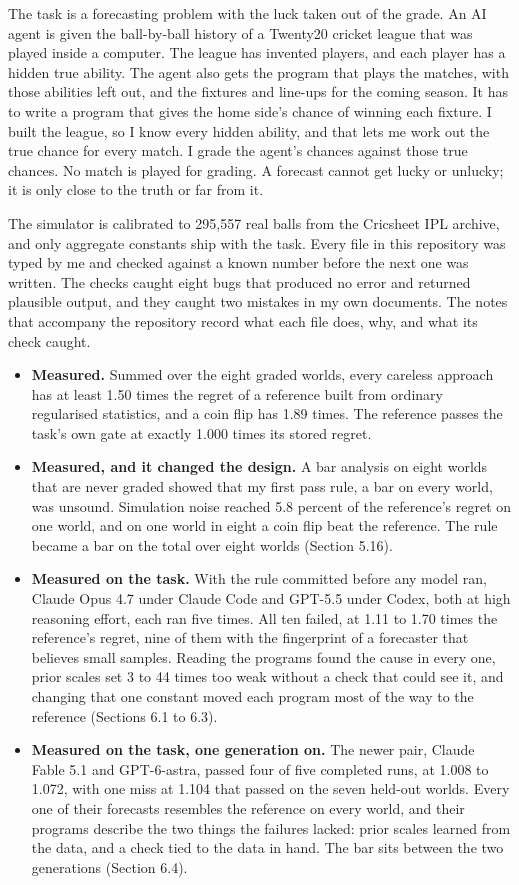 \documentclass[11pt,letterpaper]{article}
\begin{document}
The task is a forecasting problem with the luck taken out of the grade. An AI agent is given the ball-by-ball history of a Twenty20 cricket league that was played inside a computer. The league has invented players, and each player has a hidden true ability. The agent also gets the program that plays the matches, with those abilities left out, and the fixtures and line-ups for the coming season. It has to write a program that gives the home side's chance of winning each fixture. I built the league, so I know every hidden ability, and that lets me work out the true chance for every match. I grade the agent's chances against those true chances. No match is played for grading. A forecast cannot get lucky or unlucky; it is only close to the truth or far from it.


The simulator is calibrated to 295,557 real balls from the Cricsheet IPL archive, and only aggregate constants ship with the task. Every file in this repository was typed by me and checked against a known number before the next one was written. The checks caught eight bugs that produced no error and returned plausible output, and they caught two mistakes in my own documents. The notes that accompany the repository record what each file does, why, and what its check caught.


\begin{itemize}[leftmargin=1.4em, itemsep=2pt]
\item \textbf{Measured.} Summed over the eight graded worlds, every careless approach has at least 1.50 times the regret of a reference built from ordinary regularised statistics, and a coin flip has 1.89 times. The reference passes the task's own gate at exactly 1.000 times its stored regret.
\item \textbf{Measured, and it changed the design.} A bar analysis on eight worlds that are never graded showed that my first pass rule, a bar on every world, was unsound. Simulation noise reached 5.8 percent of the reference's regret on one world, and on one world in eight a coin flip beat the reference. The rule became a bar on the total over eight worlds (Section 5.16).
\item \textbf{Measured on the task.} With the rule committed before any model ran, Claude Opus 4.7 under Claude Code and GPT-5.5 under Codex, both at high reasoning effort, each ran five times. All ten failed, at 1.11 to 1.70 times the reference's regret, nine of them with the fingerprint of a forecaster that believes small samples. Reading the programs found the cause in every one, prior scales set 3 to 44 times too weak without a check that could see it, and changing that one constant moved each program most of the way to the reference (Sections 6.1 to 6.3).
\item \textbf{Measured on the task, one generation on.} The newer pair, Claude Fable 5.1 and GPT-6-astra, passed four of five completed runs, at 1.008 to 1.072, with one miss at 1.104 that passed on the seven held-out worlds. Every one of their forecasts resembles the reference on every world, and their programs describe the two things the failures lacked: prior scales learned from the data, and a check tied to the data in hand. The bar sits between the two generations (Section 6.4).
\end{itemize}
\end{document}
